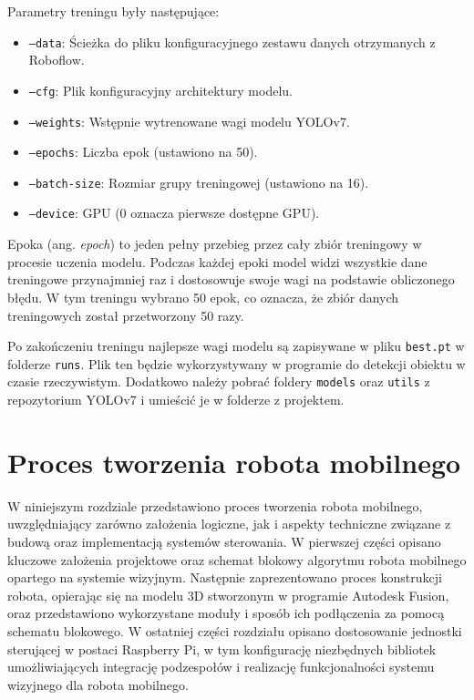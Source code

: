 \documentclass[a4paper,twoside,12pt]{book}
\begin{document}
Parametry treningu były następujące:
\begin{itemize}
    \item \texttt{--data}: Ścieżka do pliku konfiguracyjnego zestawu danych otrzymanych z Roboflow.
    \item \texttt{--cfg}: Plik konfiguracyjny architektury modelu.
    \item \texttt{--weights}: Wstępnie wytrenowane wagi modelu YOLOv7.
    \item \texttt{--epochs}: Liczba epok (ustawiono na 50).
    \item \texttt{--batch-size}: Rozmiar grupy treningowej (ustawiono na 16).
    \item \texttt{--device}: GPU (0 oznacza pierwsze dostępne GPU).
\end{itemize}

Epoka (ang. \textit{epoch}) to jeden pełny przebieg przez cały zbiór treningowy w procesie uczenia modelu. Podczas każdej epoki model widzi wszystkie dane treningowe przynajmniej raz i dostosowuje swoje wagi na podstawie obliczonego błędu. W tym treningu wybrano 50 epok, co oznacza, że zbiór danych treningowych został przetworzony 50 razy.

Po zakończeniu treningu najlepsze wagi modelu są zapisywane w pliku \texttt{best.pt} w folderze \texttt{runs}. Plik ten będzie wykorzystywany w programie do detekcji obiektu w czasie rzeczywistym. Dodatkowo należy pobrać foldery \texttt{models} oraz \texttt{utils} z repozytorium YOLOv7 i umieścić je w folderze z projektem.


\chapter{Proces tworzenia robota mobilnego}
\label{ch:04}
W niniejszym rozdziale przedstawiono proces tworzenia robota mobilnego, uwzględniający zarówno założenia logiczne, jak i aspekty techniczne związane z budową oraz implementacją systemów sterowania. W pierwszej części opisano kluczowe założenia projektowe oraz schemat blokowy algorytmu robota mobilnego opartego na systemie wizyjnym. Następnie zaprezentowano proces konstrukcji robota, opierając się na modelu 3D stworzonym w programie Autodesk Fusion, oraz przedstawiono wykorzystane moduły i sposób ich podłączenia za pomocą schematu blokowego. W ostatniej części rozdziału opisano dostosowanie jednostki sterującej w postaci Raspberry Pi, w tym konfigurację niezbędnych bibliotek umożliwiających integrację podzespołów i realizację funkcjonalności systemu wizyjnego dla robota mobilnego.
\end{document}
